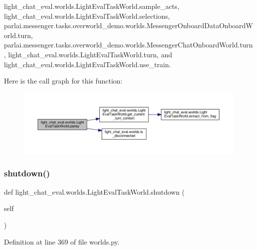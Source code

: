 light\+\_\+chat\+\_\+eval.\+worlds.\+Light\+Eval\+Task\+World.\+sample\+\_\+acts, light\+\_\+chat\+\_\+eval.\+worlds.\+Light\+Eval\+Task\+World.\+selections, parlai.\+messenger.\+tasks.\+overworld\+\_\+demo.\+worlds.\+Messenger\+Onboard\+Data\+Onboard\+World.\+turn, parlai.\+messenger.\+tasks.\+overworld\+\_\+demo.\+worlds.\+Messenger\+Chat\+Onboard\+World.\+turn, light\+\_\+chat\+\_\+eval.\+worlds.\+Light\+Eval\+Task\+World.\+turn, and light\+\_\+chat\+\_\+eval.\+worlds.\+Light\+Eval\+Task\+World.\+use\+\_\+train.

Here is the call graph for this function\+:
\nopagebreak
\begin{figure}[H]
\begin{center}
\leavevmode
\includegraphics[width=350pt]{classlight__chat__eval_1_1worlds_1_1LightEvalTaskWorld_ae0eca37fa3376ebcd24115d1246dfd81_cgraph}
\end{center}
\end{figure}
\mbox{\label{classlight__chat__eval_1_1worlds_1_1LightEvalTaskWorld_a86acc8c22dd59f854c4a43f34d804975}} 
\subsubsection{\texorpdfstring{shutdown()}{shutdown()}}
{\footnotesize\ttfamily def light\+\_\+chat\+\_\+eval.\+worlds.\+Light\+Eval\+Task\+World.\+shutdown (\begin{DoxyParamCaption}\item[{}]{self }\end{DoxyParamCaption})}



Definition at line 369 of file worlds.\+py.




